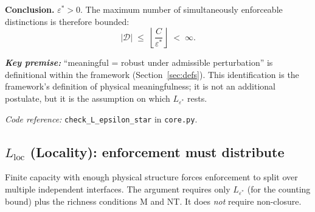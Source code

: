 \documentclass[11pt]{article}
\newcommand{\coderef}[2]{\smallskip\noindent\textit{Code reference:} \texttt{#1} in \texttt{#2}.}
\begin{document}
\begin{tcolorbox}[apfbox, title={Lemma $L_{\varepsilon^*}$ (Minimum Cost)}]
\smallskip\noindent\textbf{Conclusion.}  $\varepsilon^* > 0$.  The maximum number of simultaneously enforceable distinctions is therefore bounded:
\begin{equation}
|\mathcal{D}| \;\le\; \left\lfloor \frac{C}{\varepsilon^*} \right\rfloor \;<\; \infty.
\end{equation}

\smallskip\noindent\textbf{\textit{Key premise:}} ``meaningful = robust under admissible perturbation'' is definitional within the framework (Section~\ref{sec:defs}).  This identification is the framework's definition of physical meaningfulness; it is not an additional postulate, but it is the assumption on which $L_{\varepsilon^*}$ rests.

\coderef{check\_L\_epsilon\_star}{core.py}
\end{tcolorbox}


\subsection{\texorpdfstring{$L_{\mathrm{loc}}$}{L loc} (Locality): enforcement must distribute}

Finite capacity with enough physical structure forces enforcement to split over multiple independent interfaces.  The argument requires only $L_{\varepsilon^*}$ (for the counting bound) plus the richness conditions M and NT.  It does \emph{not} require non-closure.
\end{document}

